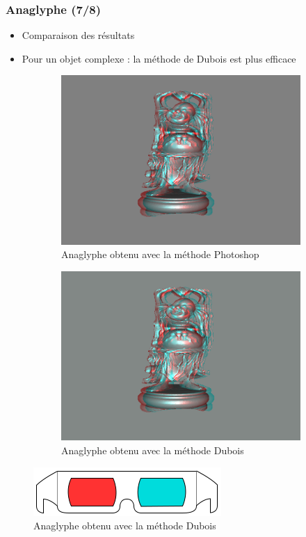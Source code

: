 \documentclass{beamer}
\begin{document}
\begin{frame}
\frametitle{Anaglyphe (7/8)}
\begin{itemize}[label=$\bullet$]
	\item Comparaison des résultats 
	\item Pour un objet complexe : la méthode de Dubois est plus efficace
\end{itemize}
\begin{figure}
	\centering
	\caption{Comparaison des deux résultats avec un objet complexe très détaillé}
	\begin{subfigure}{0.5\textwidth}
		\centering
		\includegraphics[width=0.9\linewidth]{happy_photoshop.png}
		\caption{Anaglyphe obtenu avec la méthode Photoshop}
	\end{subfigure}%
	\begin{subfigure}{.5\textwidth}
		\centering
		\includegraphics[width=0.9\linewidth]{happy_dubois.png}
		\caption{Anaglyphe obtenu avec la méthode Dubois}
	\end{subfigure}
	\includegraphics[scale=0.2]{lunettes.png}
	
\end{figure}
\end{frame}
\end{document}
